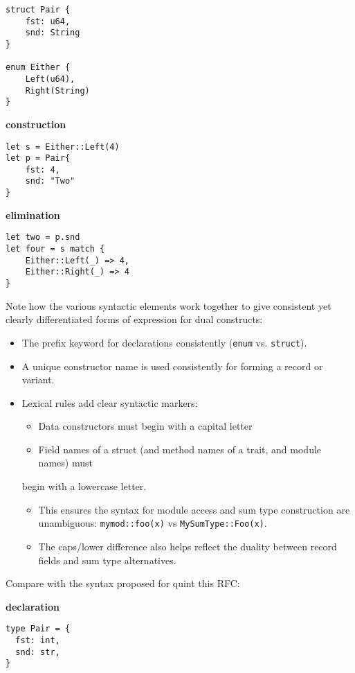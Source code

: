 \documentclass[11pt]{article}
\begin{document}
\begin{enumerate}
\begin{verbatim}
struct Pair {
    fst: u64,
    snd: String
}

enum Either {
    Left(u64),
    Right(String)
}
\end{verbatim}

\textbf{construction}

\begin{verbatim}
let s = Either::Left(4)
let p = Pair{
    fst: 4,
    snd: "Two"
}
\end{verbatim}

\textbf{elimination}

\begin{verbatim}
let two = p.snd
let four = s match {
    Either::Left(_) => 4,
    Either::Right(_) => 4
}
\end{verbatim}

Note how the various syntactic elements work together to give consistent yet
clearly differentiated forms of expression for dual constructs:

\begin{itemize}
\item The prefix keyword for declarations consistently (\texttt{enum} vs. \texttt{struct}).
\item A unique constructor name is used consistently for forming a record or
variant.
\item Lexical rules add clear syntactic markers:
\begin{itemize}
\item Data constructors must begin with a capital letter
\item Field names of a struct (and method names of a trait, and module names) must
\end{itemize}
begin with a lowercase letter.
\begin{itemize}
\item This ensures the syntax for module access and sum type construction are
unambiguous: \texttt{mymod::foo(x)} vs \texttt{MySumType::Foo(x)}.
\item The caps/lower difference also helps reflect the duality between record
fields and sum type alternatives.
\end{itemize}
\end{itemize}

Compare with the syntax proposed for quint this RFC:

\textbf{declaration}

\begin{verbatim}
type Pair = {
  fst: int,
  snd: str,
}


\end{verbatim}
\end{enumerate}
\end{document}
